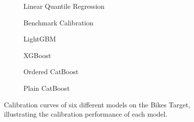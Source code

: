 \begin{figure}[htbp]
    \centering
    \begin{subfigure}[b]{0.5\textwidth}
        \centering
        
        \caption{Linear Quantile Regression}
        \label{fig:small-orfe-calibration}
    \end{subfigure}%
    \begin{subfigure}[b]{0.5\textwidth}
        \centering
        
        \caption{Benchmark Calibration}
        \label{fig:armed-play-calibration}
    \end{subfigure}
    
    \begin{subfigure}[b]{0.5\textwidth}
        \centering
        
        \caption{LightGBM}
        \label{fig:mangy-flux-calibration}
    \end{subfigure}%
    \begin{subfigure}[b]{0.5\textwidth}
        \centering
        
        \caption{XGBoost}
        \label{fig:couth-ruby-calibration}
    \end{subfigure}
    
    \begin{subfigure}[b]{0.5\textwidth}
        \centering
        
        \caption{Ordered CatBoost}
        \label{fig:civil-leas-calibration}
    \end{subfigure}%
    \begin{subfigure}[b]{0.5\textwidth}
        \centering
        
        \caption{Plain CatBoost}
        \label{fig:blear-dita-calibration}
    \end{subfigure}
    
    \caption{Calibration curves of six different models on the Bikes Target, illustrating the calibration performance of each model.}
    \label{fig:bikes_calibration}
\end{figure}

